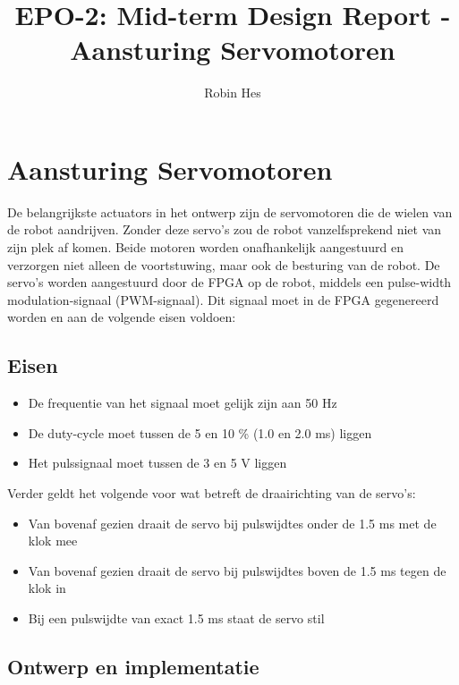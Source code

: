 \documentclass{report}
\title{EPO-2: Mid-term Design Report - Aansturing Servomotoren}
\author{Robin Hes}
\begin{document}
\chapter{Aansturing Servomotoren}
\label{ch:servo}

De belangrijkste actuators in het ontwerp zijn de servomotoren die de wielen van de robot aandrijven.
Zonder deze servo's zou de robot vanzelfsprekend niet van zijn plek af komen.
Beide motoren worden onafhankelijk aangestuurd en verzorgen niet alleen de voortstuwing, maar ook de besturing van de robot.
De servo's worden aangestuurd door de FPGA op de robot, middels een pulse-width modulation-signaal (PWM-signaal).
Dit signaal moet in de FPGA gegenereerd worden en aan de volgende eisen voldoen:

\section{Eisen}
\label{sec:servo-eisen}

\begin{itemize}
	\item De frequentie van het signaal moet gelijk zijn aan 50 Hz
	\item De duty-cycle moet tussen de 5 en 10 \% (1.0 en 2.0 ms) liggen
	\item Het pulssignaal moet tussen de 3 en 5 V liggen
\end{itemize}

\noindent
Verder geldt het volgende voor wat betreft de draairichting van de servo's:

\begin{itemize}
	\item Van bovenaf gezien draait de servo bij pulswijdtes onder de 1.5 ms met de klok mee
	\item Van bovenaf gezien draait de servo bij pulswijdtes boven de 1.5 ms tegen de klok in
	\item Bij een pulswijdte van exact 1.5 ms staat de servo stil
\end{itemize}

\section{Ontwerp en implementatie}
\label{sec:servo-design}
\end{document}
